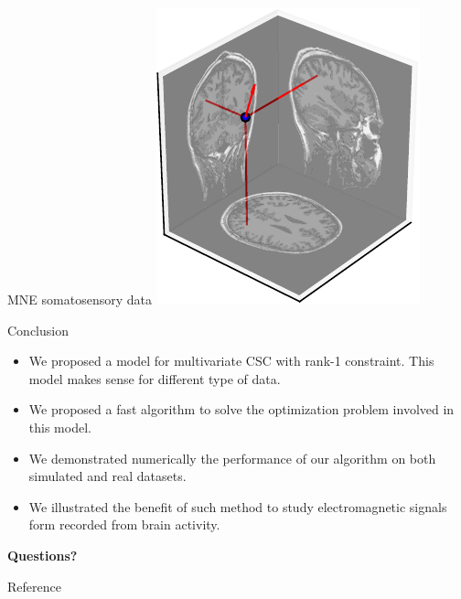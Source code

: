\documentclass{beamer}
\begin{document}
\begin{frame}{MNE somatosensory data}
\includegraphics[height=.35\textheight]{atoms_somato_d.pdf}
\end{frame}

\begin{frame}{Conclusion}
	\begin{itemize}\itemsep1.5em
		\item We proposed a model for multivariate CSC with rank-1 constraint. This model makes sense for different type of data.
		\item We proposed a fast algorithm to solve the optimization problem involved in this model.
		\item We demonstrated numerically the performance of our algorithm on both simulated and real datasets.
		\item We illustrated the benefit of such method to study electromagnetic signals form recorded from brain activity. 
	\end{itemize}

\end{frame}

\begin{frame}
\centering
{}
\Huge \bf Questions?
\end{frame}


\begin{frame}{Reference}
\tiny

\end{frame}
\end{document}

